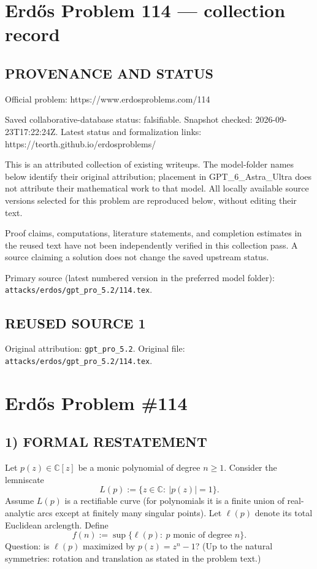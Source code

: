 \section*{Erd\H{o}s Problem 114 --- collection record}

\subsection*{PROVENANCE AND STATUS}
Official problem: https://www.erdosproblems.com/114

Saved collaborative-database status: falsifiable.
Snapshot checked: 2026-09-23T17:22:24Z.
Latest status and formalization links: https://teorth.github.io/erdosproblems/

This is an attributed collection of existing writeups. The model-folder names below identify their original attribution; placement in GPT\_6\_Astra\_Ultra does not attribute their mathematical work to that model. All locally available source versions selected for this problem are reproduced below, without editing their text.

Proof claims, computations, literature statements, and completion estimates in the reused text have not been independently verified in this collection pass. A source claiming a solution does not change the saved upstream status.

Primary source (latest numbered version in the preferred model folder): \texttt{attacks/erdos/gpt\_pro\_5.2/114.tex}.

\subsection*{REUSED SOURCE 1}
Original attribution: \texttt{gpt\_pro\_5.2}.
Original file: \texttt{attacks/erdos/gpt\_pro\_5.2/114.tex}.


\section*{Erd\H{o}s Problem \#114}

\subsection*{1) FORMAL RESTATEMENT}
Let $p(z)\in\mathbb C[z]$ be a monic polynomial of degree $n\ge1$.  Consider the lemniscate
\[
L(p):=\{z\in\mathbb C:\ |p(z)|=1\}.
\]
Assume $L(p)$ is a rectifiable curve (for polynomials it is a finite union of real-analytic arcs except at finitely many singular points).  Let $\ell(p)$ denote its total Euclidean arclength.  Define
\[
 f(n):=\sup\{\ell(p):\ p\text{ monic of degree }n\}.
\]
Question: is $\ell(p)$ maximized by $p(z)=z^n-1$?  (Up to the natural symmetries: rotation and translation as stated in the problem text.)


